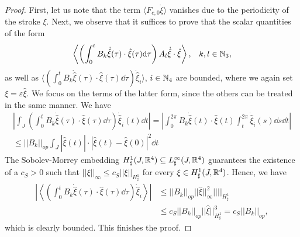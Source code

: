 \begin{proof}
First, let us note that the term $\langle F_{c,0} \dot{\xi} \rangle$ vanishes due to the periodicity of the stroke $\xi$. Next, we observe that it suffices to prove that the scalar quantities of the form 
\begin{align}
\left \langle \left ( \int_{0}^{t} B_k \dot{\hat{\xi}}(\tau)  \cdot \hat{\xi}(\tau) \mathrm{d}\tau \right ) A_l \dot{\hat{\xi}} \cdot \hat{\xi} \right  \rangle, & & k,l \in \mathbb{N}_3,
\end{align}
as well as $ \langle  ( \int_{0}^{t} B_k \dot{\hat{\xi}}(\tau)  \cdot \hat{\xi}(\tau) \dd \tau  )\dot{\hat{\xi}}_i  \rangle$, $i \in \mathbb{N}_4$ are bounded, where we again set $\xi = \varepsilon \hat{\xi}$. We focus on the terms of the latter form, since the others can be treated in the same manner. We have
\begin{equation}
\begin{aligned}
\left |\int_J \left ( \int_{0}^{t} B_k \dot{\hat{\xi}}(\tau) \cdot \hat{\xi}(\tau) \dd \tau\right ) \dot{\hat{\xi}}_i(t) \dd t \right | = \left | \int_{0}^{2\pi} B_k \dot{\hat{\xi}}(t) \cdot \hat{\xi}(t) \int_{t}^{2 \pi} \dot{\hat{\xi}}_i(s) \dd s \dd t \right |\\
\leq ||B_k||_{op} \int_{J} |\dot{\hat{\xi}}(t)| \cdot |\hat{\xi}(t) - \hat{\xi}(0)|^2 \dd t
\end{aligned}
\end{equation}
The Sobolev-Morrey embedding $H_\sharp^{1}(J, \mathbb{R}^4) \subseteq L^\infty_{\sharp}(J, \mathbb{R}^4)$ guarantees the existence of a $c_S > 0$ such that $||\xi||_{\infty} \leq c_S ||\xi||_{H_\sharp^1}$ for every $\xi \in H_\sharp^1(J, \mathbb{R}^4)$. Hence, we have
\begin{equation}
\begin{aligned}
\left | \left \langle \left  ( \int_{0}^{t} B_k \dot{\hat{\xi}}(\tau)  \cdot \hat{\xi}(\tau) \dd \tau  \right )\dot{\hat{\xi}}_i \right  \rangle\right |
& \leq ||B_k||_{op} ||\hat{\xi}||_{\infty}^2 ||||_{H_\sharp^1}\\
&\leq c_S ||B_k||_{op} ||\hat{\xi}||_{H_\sharp^1}^3 = c_S ||B_k||_{op},
\end{aligned}
\end{equation}
which is clearly bounded. This finishes the proof.
\end{proof}

